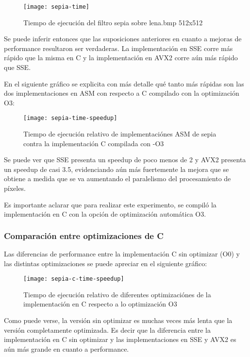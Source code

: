 \begin{figure}[h]
    \centering
    \texttt{[image: sepia-time]}
    \caption{Tiempo de ejecución del filtro sepia sobre lena.bmp 512x512}
    \label{fig:sepia-time}
\end{figure}

Se puede inferir entonces que las suposiciones anteriores en cuanto a mejoras de performance resultaron ser verdaderas. La implementación en SSE corre más rápido que la misma en C y la implementación en AVX2 corre aún más rápido que SSE.

En el siguiente gráfico se explicita con más detalle qué tanto más rápidas son las dos implementaciones en ASM con respecto a C compilado con la optimización O3:

\begin{figure}[h]
    \centering
    \texttt{[image: sepia-time-speedup]}
    \caption{Tiempo de ejecución relativo de implementaciónes ASM de sepia contra la implementación C compilada con -O3}
    \label{fig:sepia-time-speedup}
\end{figure}

Se puede ver que SSE presenta un speedup de poco menos de 2 y AVX2 presenta un speedup de casi 3.5, evidenciando aún más fuertemente la mejora que se obtiene a medida que se va aumentando el paralelismo del procesamiento de píxeles.

Es importante aclarar que para realizar este experimento, se compiló la implementación en C con la opción de optimización automática O3.

\subsubsection{Comparación entre optimizaciones de C}

Las diferencias de performance entre la implementación C sin optimizar (O0) y las distintas optimizaciones se puede apreciar en el siguiente gráfico:

\begin{figure}[h]
    \centering
    \texttt{[image: sepia-c-time-speedup]}
    \caption{Tiempo de ejecución relativo de diferentes optimizaciónes de la implementación en C respecto a lo optimización O3}
    \label{fig:sepia-c-time}
\end{figure}

Como puede verse, la versión sin optimizar es muchas veces más lenta que la versión completamente optimizada. Es decir que la diferencia entre la implementación en C sin optimizar y las implementaciones en SSE y AVX2 es aún más grande en cuanto a performance.

